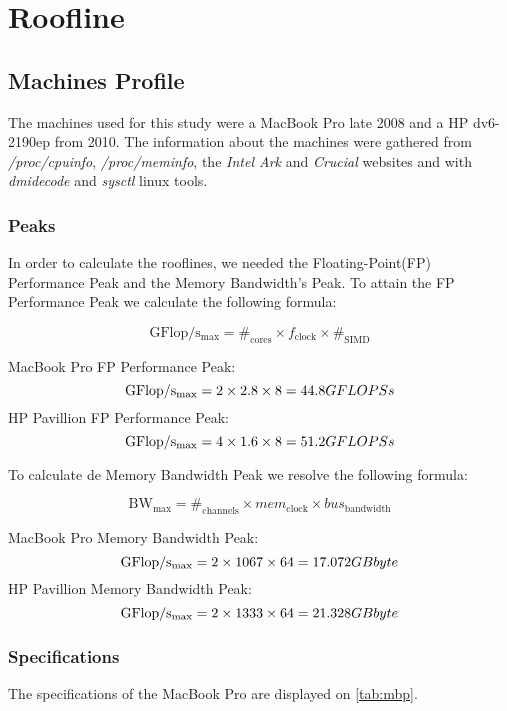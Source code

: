 \documentclass[a4paper,10pt,openright,openbib]{article}
\begin{document}
\section{Roofline}
\subsection{Machines Profile}
The machines used for this study were a MacBook Pro late 2008 and a HP dv6-2190ep from 2010.
The information about the machines were gathered from \emph{/proc/cpuinfo}, \emph{/proc/meminfo}, the \emph{Intel Ark} \cite{ark} and \emph{Crucial} \cite{crucial} websites and with \emph{dmidecode} and \emph{sysctl} linux tools.

\subsubsection{Peaks}
In order to calculate the rooflines, we needed the Floating-Point(FP) Performance Peak and the Memory Bandwidth's Peak. 
To attain the FP Performance Peak we calculate the following formula:

$$\mathrm{GFlop/s_{max}} =  \#_{\mathrm{cores}} \times f_{\mathrm{clock}} \times \#_{\mathrm{SIMD}}$$

MacBook Pro FP Performance Peak:
$$\mathrm{GFlop/s_{max}} =  2 \times 2.8 \times 8
						 =  44.8 GFLOPS\\s$$
HP Pavillion FP Performance Peak:
$$\mathrm{GFlop/s_{max}} =  4 \times 1.6 \times 8
						 =  51.2 GFLOPS\\s$$

To calculate de Memory Bandwidth Peak we resolve the following formula:

$$\mathrm{BW_{max}} =  \#_{\mathrm{channels}} \times mem_{\mathrm{clock}} \times bus_{\mathrm{bandwidth}}$$
 
MacBook Pro Memory Bandwidth Peak:
$$\mathrm{GFlop/s_{max}} =  2 \times 1067 \times 64
						 =  17.072 GB\\byte$$
HP Pavillion Memory Bandwidth Peak:
$$\mathrm{GFlop/s_{max}} =  2 \times 1333 \times 64
						 =  21.328 GB\\byte$$

\subsubsection{Specifications}
The specifications of the MacBook Pro are displayed on \autoref{tab:mbp}. \\
\end{document}
